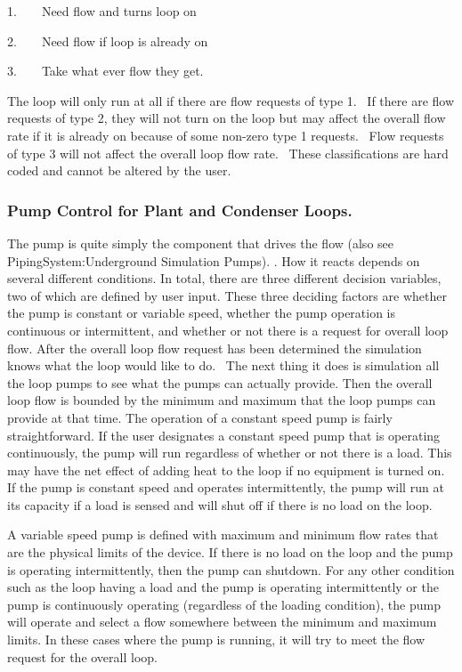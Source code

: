 1.~~~~Need flow and turns loop on

2.~~~~Need flow if loop is already on

3.~~~~Take what ever flow they get.

The loop will only run at all if there are flow requests of type 1.~ If there are flow requests of type 2, they will not turn on the loop but may affect the overall flow rate if it is already on because of some non-zero type 1 requests.~ Flow requests of type 3 will not affect the overall loop flow rate.~ These classifications are hard coded and cannot be altered by the user.

\subsubsection{Pump Control for Plant and Condenser Loops.}\label{pump-control-for-plant-and-condenser-loops.}

The pump is quite simply the component that drives the flow (also see PipingSystem:Underground Simulation Pumps). . How it reacts depends on several different conditions. In total, there are three different decision variables, two of which are defined by user input. These three deciding factors are whether the pump is constant or variable speed, whether the pump operation is continuous or intermittent, and whether or not there is a request for overall loop flow. After the overall loop flow request has been determined the simulation knows what the loop would like to do.~ The next thing it does is simulation all the loop pumps to see what the pumps can actually provide. Then the overall loop flow is bounded by the minimum and maximum that the loop pumps can provide at that time. The operation of a constant speed pump is fairly straightforward. If the user designates a constant speed pump that is operating continuously, the pump will run regardless of whether or not there is a load. This may have the net effect of adding heat to the loop if no equipment is turned on. If the pump is constant speed and operates intermittently, the pump will run at its capacity if a load is sensed and will shut off if there is no load on the loop.

A variable speed pump is defined with maximum and minimum flow rates that are the physical limits of the device. If there is no load on the loop and the pump is operating intermittently, then the pump can shutdown. For any other condition such as the loop having a load and the pump is operating intermittently or the pump is continuously operating (regardless of the loading condition), the pump will operate and select a flow somewhere between the minimum and maximum limits. In these cases where the pump is running, it will try to meet the flow request for the overall loop.

